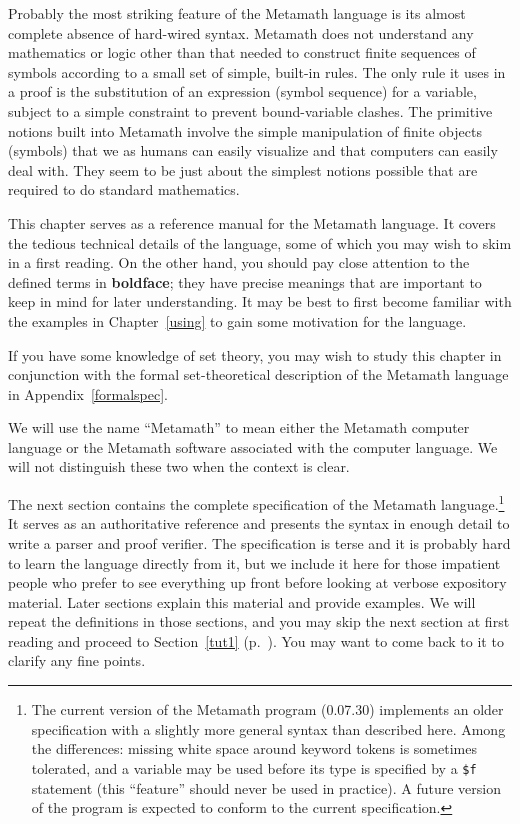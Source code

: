 Probably the most striking feature of the Metamath language is its almost
complete absence of hard-wired syntax. Metamath does not
understand any mathematics or logic other than that needed to construct finite
sequences of symbols according to a small set of simple, built-in rules.  The
only rule it uses in a proof is the substitution of an expression (symbol
sequence) for a variable, subject to a simple constraint to prevent
bound-variable clashes.  The primitive notions built into Metamath involve the
simple manipulation of finite objects (symbols) that we as humans can easily
visualize and that computers can easily deal with.  They seem to be just
about the simplest notions possible that are required to do standard
mathematics.

This chapter serves as a reference manual for the Metamath
language. It covers the tedious technical details of the language, some of
which you may wish to skim in a first reading.  On the other hand, you should
pay close attention to the defined terms in {\bf boldface}; they have precise
meanings that are important to keep in mind for later understanding.  It may
be best to first become familiar with the examples in Chapter~\ref{using} to
gain some motivation for the language.

If you have some knowledge of set theory, you may wish to study this
chapter in conjunction with the formal set-theoretical description of the
Metamath language in Appendix~\ref{formalspec}.

We will use the name ``Metamath'' to mean either the Metamath
computer language or the Metamath software associated with the computer
language.  We will not distinguish these two when the context is clear.

The next section contains the complete specification of the Metamath
language.\footnote{The current version of the Metamath program
(0.07.30) implements an
older specification with a slightly more general syntax than described
here.  Among the differences:  missing white space around keyword tokens
is sometimes tolerated, and a variable may be used before its type is
specified by a \texttt{\$f} statement (this ``feature'' should never be
used in practice).  A future version of the program is
expected to conform to the current specification.} It serves as an
authoritative reference and presents the syntax in enough detail to
write a parser and proof verifier.  The
specification is terse and it is probably hard to learn the language
directly from it, but we include it here for those impatient people who
prefer to see everything up front before looking at verbose expository
material.  Later sections explain this material and provide examples.
We will repeat the definitions in those sections, and you may skip the
next section at first reading and proceed to Section~\ref{tut1}
(p.~\pageref{tut1}).  You may want to come back to it to clarify any
fine points.

